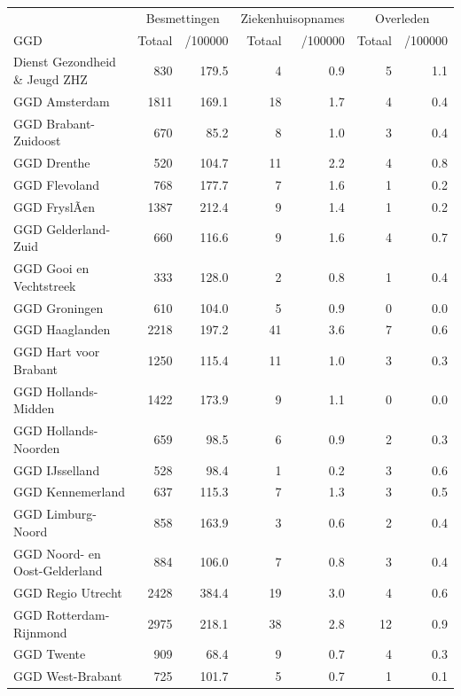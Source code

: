\documentclass[
  english,
  man,floatsintext]{apa6}
\begin{document}
\begin{table}
\centering\begingroup\fontsize{10}{12}\selectfont

\begin{threeparttable}
\begin{tabular}{lrrrrrr}
\toprule
\multicolumn{1}{c}{ } & \multicolumn{2}{c}{Besmettingen} & \multicolumn{2}{c}{Ziekenhuisopnames} & \multicolumn{2}{c}{Overleden} \\
\cmidrule(l{3pt}r{3pt}){2-3} \cmidrule(l{3pt}r{3pt}){4-5} \cmidrule(l{3pt}r{3pt}){6-7}
GGD & Totaal & /100000 & Totaal & /100000 & Totaal & /100000\\
\midrule
Dienst Gezondheid \& Jeugd ZHZ & 830 & 179.5 & 4 & 0.9 & 5 & 1.1\\
GGD Amsterdam & 1811 & 169.1 & 18 & 1.7 & 4 & 0.4\\
GGD Brabant-Zuidoost & 670 & 85.2 & 8 & 1.0 & 3 & 0.4\\
GGD Drenthe & 520 & 104.7 & 11 & 2.2 & 4 & 0.8\\
GGD Flevoland & 768 & 177.7 & 7 & 1.6 & 1 & 0.2\\
GGD FryslÃ¢n & 1387 & 212.4 & 9 & 1.4 & 1 & 0.2\\
GGD Gelderland-Zuid & 660 & 116.6 & 9 & 1.6 & 4 & 0.7\\
GGD Gooi en Vechtstreek & 333 & 128.0 & 2 & 0.8 & 1 & 0.4\\
GGD Groningen & 610 & 104.0 & 5 & 0.9 & 0 & 0.0\\
GGD Haaglanden & 2218 & 197.2 & 41 & 3.6 & 7 & 0.6\\
GGD Hart voor Brabant & 1250 & 115.4 & 11 & 1.0 & 3 & 0.3\\
GGD Hollands-Midden & 1422 & 173.9 & 9 & 1.1 & 0 & 0.0\\
GGD Hollands-Noorden & 659 & 98.5 & 6 & 0.9 & 2 & 0.3\\
GGD IJsselland & 528 & 98.4 & 1 & 0.2 & 3 & 0.6\\
GGD Kennemerland & 637 & 115.3 & 7 & 1.3 & 3 & 0.5\\
GGD Limburg-Noord & 858 & 163.9 & 3 & 0.6 & 2 & 0.4\\
GGD Noord- en Oost-Gelderland & 884 & 106.0 & 7 & 0.8 & 3 & 0.4\\
GGD Regio Utrecht & 2428 & 384.4 & 19 & 3.0 & 4 & 0.6\\
GGD Rotterdam-Rijnmond & 2975 & 218.1 & 38 & 2.8 & 12 & 0.9\\
GGD Twente & 909 & 68.4 & 9 & 0.7 & 4 & 0.3\\
GGD West-Brabant & 725 & 101.7 & 5 & 0.7 & 1 & 0.1\\

\end{tabular}
\end{threeparttable}
\end{table}
\end{document}
